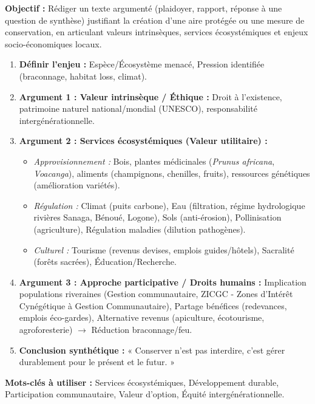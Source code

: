 \documentclass[11pt]{article}
\newcommand{\cle}[1]{{\popxbold\color{popdark}#1}}
\begin{document}
\begin{methode}
    \textbf{Objectif :} Rédiger un texte argumenté (plaidoyer, rapport, réponse à une question de synthèse) justifiant la création d'une aire protégée ou une mesure de conservation, en articulant valeurs intrinsèques, services écosystémiques et enjeux socio-économiques locaux.
    \begin{enumerate}
        \item \textbf{Définir l'enjeu :} Espèce/Écosystème menacé, Pression identifiée (braconnage, habitat loss, climat).
        \item \textbf{Argument 1 : Valeur intrinsèque / Éthique :} Droit à l'existence, patrimoine naturel national/mondial (UNESCO), responsabilité intergénérationnelle.
        \item \textbf{Argument 2 : Services écosystémiques (Valeur utilitaire) :}
              \begin{itemize}
                  \item \textit{Approvisionnement :} Bois, plantes médicinales (\emph{Prunus africana}, \emph{Voacanga}), aliments (champignons, chenilles, fruits), ressources génétiques (amélioration variétés).
                  \item \textit{Régulation :} Climat (puits carbone), Eau (filtration, régime hydrologique rivières Sanaga, Bénoué, Logone), Sols (anti-érosion), Pollinisation (agriculture), Régulation maladies (dilution pathogènes).
                  \item \textit{Culturel :} Tourisme (revenus devises, emplois guides/hôtels), Sacralité (forêts sacrées), Éducation/Recherche.
              \end{itemize}
        \item \textbf{Argument 3 : Approche participative / Droits humains :} Implication populations riveraines (Gestion communautaire, ZICGC - Zones d'Intérêt Cynégétique à Gestion Communautaire), Partage bénéfices (redevances, emplois éco-gardes), Alternative revenus (apiculture, écotourisme, agroforesterie) $\rightarrow$ Réduction braconnage/feu.
        \item \textbf{Conclusion synthétique :} « Conserver n'est pas interdire, c'est gérer durablement pour le présent et le futur. »
    \end{enumerate}
    \textbf{Mots-clés à utiliser :} \cle{Services écosystémiques}, \cle{Développement durable}, \cle{Participation communautaire}, \cle{Valeur d'option}, \cle{Équité intergénérationnelle}.
\end{methode}
\end{document}
